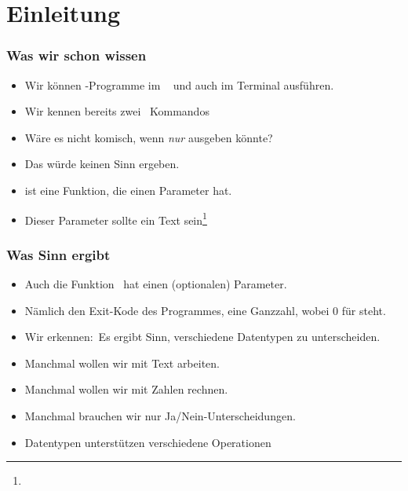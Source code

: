 \documentclass[aspectratio=169,mathserif,notheorems]{beamer}%
\subtitle{7.~Der Datentype int}%
\begin{document}
%
%
\startPresentation%
%
\section{Einleitung}%
%
\begin{frame}%
\frametitle{Was wir schon wissen}%
\begin{itemize}%
\item Wir können \python-Programme im \pycharm\  und auch im Terminal ausführen.%
\item<2-> Wir kennen bereits zwei \python\ Kommandos%
\item<5-> Wäre es nicht komisch, wenn  \emph{nur}  ausgeben könnte?%
\item<6-> Das würde keinen Sinn ergeben.%
\item<7->  ist eine Funktion, die einen Parameter hat.%
\item<8-> Dieser Parameter sollte ein Text sein\footnote<8->{}%
\end{itemize}%
\end{frame}%
%
\begin{frame}%
\frametitle{Was Sinn ergibt}%
\begin{itemize}%
\item Auch die Funktion~ hat einen (optionalen) Parameter.%
\item<2-> Nämlich den Exit-Kode des Programmes\cite{J2024PTOGBSI8IS12E:TAP}, eine Ganzzahl, wobei 0 für  steht.\medskip%
\item<3-> Wir erkennen:~Es ergibt Sinn, verschiedene Datentypen zu unterscheiden.%
\item<4-> Manchmal wollen wir mit Text arbeiten.%
\item<5-> Manchmal wollen wir mit Zahlen rechnen.%
\item<6-> Manchmal brauchen wir nur Ja/Nein-Unterscheidungen.%
\item<7-> Datentypen unterstützen verschiedene Operationen%
\end{itemize}%
\end{frame}%
\end{document}

